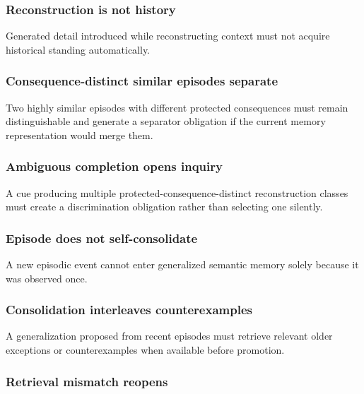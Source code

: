 \documentclass[
]{article}
\begin{document}
\subsubsection{Reconstruction is not history}\label{reconstruction-is-not-history-test}

Generated detail introduced while reconstructing context must not acquire
historical standing automatically.

\subsubsection{Consequence-distinct similar episodes separate}\label{similar-episodes-separate-test}

Two highly similar episodes with different protected consequences must remain
distinguishable and generate a separator obligation if the current memory
representation would merge them.

\subsubsection{Ambiguous completion opens inquiry}\label{ambiguous-completion-opens-inquiry-test}

A cue producing multiple protected-consequence-distinct reconstruction classes
must create a discrimination obligation rather than selecting one silently.

\subsubsection{Episode does not self-consolidate}\label{episode-does-not-self-consolidate-test}

A new episodic event cannot enter generalized semantic memory solely because it
was observed once.

\subsubsection{Consolidation interleaves counterexamples}\label{consolidation-interleaves-counterexamples-test}

A generalization proposed from recent episodes must retrieve relevant older
exceptions or counterexamples when available before promotion.

\subsubsection{Retrieval mismatch reopens}\label{retrieval-mismatch-reopens-test}
\end{document}
